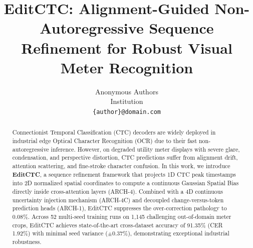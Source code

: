 \documentclass[10pt,twocolumn,letterpaper]{article}
\title{EditCTC: Alignment-Guided Non-Autoregressive Sequence Refinement for Robust Visual Meter Recognition}
\author{
Anonymous Authors\\
Institution\\
{\tt\small \{author\}@domain.com}
}
\begin{document}
\maketitle

\begin{abstract}
Connectionist Temporal Classification (CTC) decoders are widely deployed in industrial edge Optical Character Recognition (OCR) due to their fast non-autoregressive inference. However, on degraded utility meter displays with severe glare, condensation, and perspective distortion, CTC predictions suffer from alignment drift, attention scattering, and fine-stroke character confusion. In this work, we introduce \textbf{EditCTC}, a sequence refinement framework that projects 1D CTC peak timestamps into 2D normalized spatial coordinates to compute a continuous Gaussian Spatial Bias directly inside cross-attention layers (ARCH-4). Combined with a 4D continuous uncertainty injection mechanism (ARCH-4C) and decoupled change-versus-token prediction heads (ARCH-1), EditCTC suppresses the over-correction pathology to 0.08\%. Across 52 multi-seed training runs on 1,145 challenging out-of-domain meter crops, EditCTC achieves state-of-the-art cross-dataset accuracy of 91.35\% (CER 1.92\%) with minimal seed variance ($\pm 0.37\%$), demonstrating exceptional industrial robustness.
\end{abstract}











\end{document}
